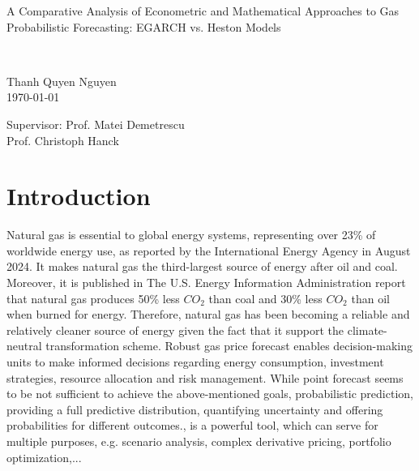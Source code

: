 \documentclass[12pt,a4paper]{article}
\numberwithin{equation}{section}
\begin{document}
\begin{titlepage}
\begin{center}
   \vspace{3cm}

\begin{large}
A Comparative Analysis of Econometric and Mathematical Approaches to Gas Probabilistic Forecasting: EGARCH vs. Heston Models
\end{large}\\
\color{black}
  \vspace{1cm}
\begin{large}
Thanh Quyen Nguyen\\
 \today                    
 \end{large}

   \vspace{3cm}
\begin{large}
   Supervisor: Prof. Matei Demetrescu\\
   \hspace{2cm} Prof. Christoph Hanck
\end{large}

  \end{center}
 \end{titlepage}

\newpage

{
  \hypersetup{linkcolor=black}
  \renewcommand{\baselinestretch}{1.5}\normalsize 
  \tableofcontents
  \thispagestyle{empty}
}


\newpage
\setcounter{page}{1}
\section{Introduction}
\renewcommand{\baselinestretch}{1.5}\normalsize 


Natural gas is essential to global energy systems, representing over 23\% of worldwide energy use, as reported by the International Energy Agency in August 2024. It makes natural gas the third-largest source of energy after oil and coal. Moreover, it is published in The U.S. Energy Information Administration report that natural gas produces 50\% less $CO_2$ than coal and 30\% less $CO_2$ than oil when burned for energy. Therefore, natural gas has been becoming a reliable and relatively cleaner source of energy given the fact that it support the climate-neutral transformation scheme. Robust gas price forecast enables decision-making units to make informed decisions regarding energy consumption, investment strategies, resource allocation and risk management. While point forecast seems to be not sufficient to achieve the above-mentioned goals, probabilistic prediction, providing a full predictive distribution, quantifying uncertainty and offering probabilities for different outcomes., is a powerful tool, which can serve for multiple purposes, e.g. scenario analysis, complex derivative pricing, portfolio optimization,...
\end{document}

